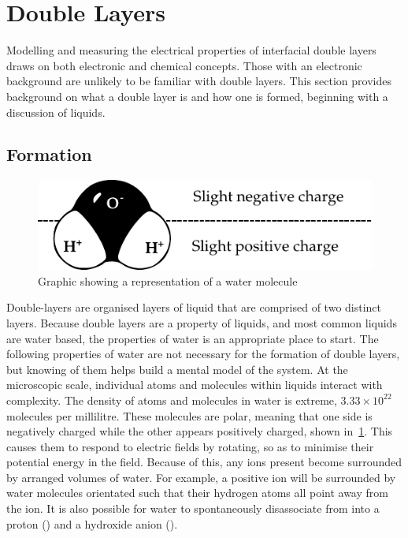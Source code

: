 

\section{Double Layers}
  \label{sect:background_doubleLayers}


  Modelling and measuring the electrical properties of interfacial double layers draws on both electronic and chemical concepts.
  Those with an electronic background are unlikely to be familiar with double layers.
  This section provides background on what a double layer is and how one is formed, beginning with a discussion of liquids.


  \subsection{Formation}
    \label{sub:background_doubleLayers_formation}


    \begin{figure}
        \begin{center}
            \includegraphics{content/introduction/graphics/polarWater}
        \end{center}
        \caption{Graphic showing a representation of a water molecule}
        \label{fig:waterMolecule}
    \end{figure}
    Double-layers are organised layers of liquid that are comprised of two distinct layers.
    Because double layers are a property of liquids, and most common liquids are water based, the properties of water is an appropriate place to start.
    The following properties of water are not necessary for the formation of double layers, but knowing of them helps build a mental model of the system.
    At the microscopic scale, individual atoms and molecules within liquids interact with complexity.
    The density of atoms and molecules in water is extreme, $3.33\times10^{22}$  molecules per millilitre.
    These molecules are polar, meaning that one side is negatively charged while the other appears positively charged, shown in~\cref{fig:waterMolecule}.
    This causes them to respond to electric fields by rotating, so as to minimise their potential energy in the field.
    Because of this, any ions present become surrounded by arranged volumes of water.
    For example, a positive ion will be surrounded by water molecules orientated such that their hydrogen atoms all point away from the ion.
    It is also possible for water to spontaneously disassociate from  into a proton () and a hydroxide anion  ().

